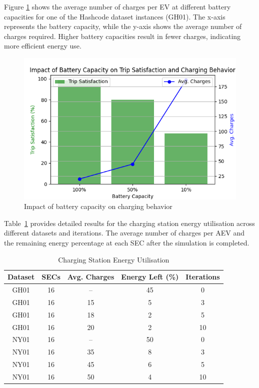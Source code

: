 Figure \ref{fig:avg_charges} shows the average number of charges per EV at different battery capacities for one of the Hashcode dataset instances (GH01). The x-axis represents the battery capacity, while the y-axis shows the average number of charges required. Higher battery capacities result in fewer charges, indicating more efficient energy use.
\begin{figure}[h]
  \vspace{-0.2cm}
  \centering
  \includegraphics[scale=0.40]{Crest/Images/tripsatisfied_vs_battery.png}
  \caption{Impact of battery capacity on charging behavior}
  \label{fig:avg_charges}
  \vspace{-0.1cm}
\end{figure}

Table~\ref{tab:energy_utilization_tab} provides detailed results for the charging station energy utilisation across different datasets and iterations. The average number of charges per AEV and the remaining energy percentage at each SEC after the simulation is completed. 
\begin{table}[h]
\caption{Charging Station Energy Utilisation}
\begin{center}
\begin{tabular}{|c|c|c|c|c|}
\hline
\textbf{Dataset} & \textbf{SECs} & \textbf{Avg. Charges} & \textbf{Energy Left (\%)} & \textbf{Iterations} \\
\hline
GH01 & 16 & -- & 45 & 0 \\
GH01 & 16 & 15 & 5 & 3 \\
GH01 & 16 & 18 & 2 & 5 \\
GH01 & 16 & 20 & 2 & 10 \\
NY01 & 16 & -- & 50 & 0 \\
NY01 & 16 & 35 & 8 & 3 \\
NY01 & 16 & 45 & 6 & 5 \\
NY01 & 16 & 50 & 4 & 10 \\
\hline
\end{tabular}
\label{tab:energy_utilization_tab}
\end{center}
\end{table}


